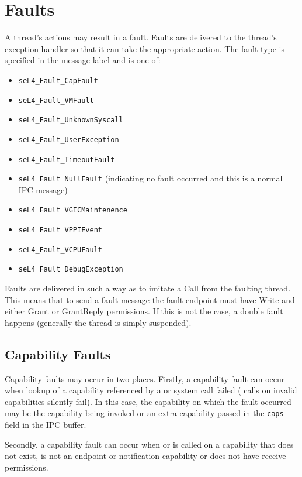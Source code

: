 \section{Faults}
\label{sec:faults}

A thread's actions may result in a fault. Faults are delivered to the
thread's exception handler so that it can take the appropriate action.
The fault type is specified in the message label and is one of:

\begin{itemize}
\item \texttt{seL4\_Fault\_CapFault}
\item \texttt{seL4\_Fault\_VMFault}
\item \texttt{seL4\_Fault\_UnknownSyscall}
\item \texttt{seL4\_Fault\_UserException}
\item \texttt{seL4\_Fault\_TimeoutFault}
\item \texttt{seL4\_Fault\_NullFault} (indicating no fault occurred and this is a normal IPC message)
\item \texttt{seL4\_Fault\_VGICMaintenence}
\item \texttt{seL4\_Fault\_VPPIEvent}
\item \texttt{seL4\_Fault\_VCPUFault}
\item \texttt{seL4\_Fault\_DebugException}
\end{itemize}

Faults are delivered in such a way as to imitate a Call from the faulting
thread. This means that to send a fault message the fault endpoint
must have Write and either Grant or GrantReply permissions. If this is not the
case, a double fault happens (generally the thread is simply suspended).

\subsection{Capability Faults}

Capability faults may occur in two places. Firstly, a capability fault
can occur when lookup of a capability referenced by a
 or  system call
failed ( calls on
invalid capabilities silently fail). In this case, the capability
on which the fault occurred may be the capability being invoked or an
extra capability passed in the \texttt{caps} field in the IPC buffer.

Secondly, a capability fault can occur when  or 
is called on a capability that does not exist, is not an endpoint or notification capability or does not have
receive permissions.

